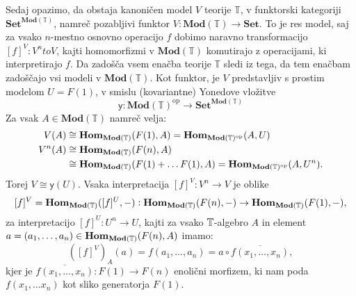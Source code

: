 \documentclass[../kategoricna_logika.tex]{subfiles}
\begin{document}
\begin{dokaz}
  Sedaj opazimo, da obstaja kanoničen model $V$ teorije $\mathbb{T}$,
  v funktorski kategoriji $\mathbf{Set}^{\mathbf{Mod}(\mathbb{T})}$, namreč
  pozabljivi funktor $V : \mathbf{Mod}(\mathbb{T}) \to \mathbf{Set}$.
  To je res model, saj za vsako $n$-mestno osnovno operacijo $f$ dobimo
  naravno transformacijo $[f]^V : V^n to V$, kajti homomorfizmi v $\mathbf{Mod}(\mathbb{T})$
  komutirajo z operacijami, ki interpretirajo $f$. Da zadošča vsem enačba teorije $\mathbb{T}$
  sledi iz tega, da tem enačbam zadoščajo vsi modeli v $\mathbf{Mod}(\mathbb{T})$.
  Kot funktor, je $V$ predstavljiv s prostim modelom $U = F(1)$, v smislu (kovariantne)
  Yonedove vložitve
  \[ \mathsf{y} : \mathbf{Mod}(\mathbb{T})^{\mathrm{op}} \to \mathbf{Set}^{\mathbf{Mod}(\mathbb{T})}\]
  Za vsak $A \in \mathbf{Mod}(\mathbb{T})$ namreč velja:
  \begin{align*}
    V(A) &\cong \mathbf{Hom}_{\mathbf{Mod}(\mathbb{T})}(F(1), A) = \mathbf{Hom}_{\mathbf{Mod}(\mathbb{T})^{\mathrm{op}}}(A,U) \\
    V^n(A) &\cong \mathbf{Hom}_{\mathbf{Mod}(\mathbb{T})}(F(n), A) \\
    &\cong \mathbf{Hom}_{\mathbf{Mod}(\mathbb{T})}(F(1) + \ldots F(1), A) = \mathbf{Hom}_{\mathbf{Mod}(\mathbb{T})^{\mathrm{op}}}(A,U^n).
  \end{align*}
  Torej $V \cong \mathsf{y}(U)$. Vsaka interpretacija $[f]^V : V^n \to V$ je oblike
  \[ [f]^V = \mathbf{Hom}_{\mathbf{Mod}(\mathbb{T})}([f]^U, -) : \mathbf{Hom}_{\mathbf{Mod}(\mathbb{T})}(F(n), -) \to \mathbf{Hom}_{\mathbf{Mod}(\mathbb{T})}(F(1), -),\]
  za interpretacijo $[f]^U: U^n \to U$, kajti za vsako $\mathbb{T}$-algebro $A$ in element
  $a = (a_1, \ldots ,a_n) \in \mathbf{Hom}_{\mathbf{Mod}(\mathbb{T})}(F(n), A)$ imamo:
  \[ ([f]^V)_A(a) = f(a_1, \ldots, a_n) = a \circ \overline{f(x_1, \ldots, x_n)},\]
  kjer je $\overline{f(x_1, \ldots, x_n)} : F(1) \to F(n)$ enolični morfizem, ki nam
  poda $f(x_1, \ldots x_n)$ kot sliko generatorja $F(1)$.


\end{dokaz}
\end{document}
